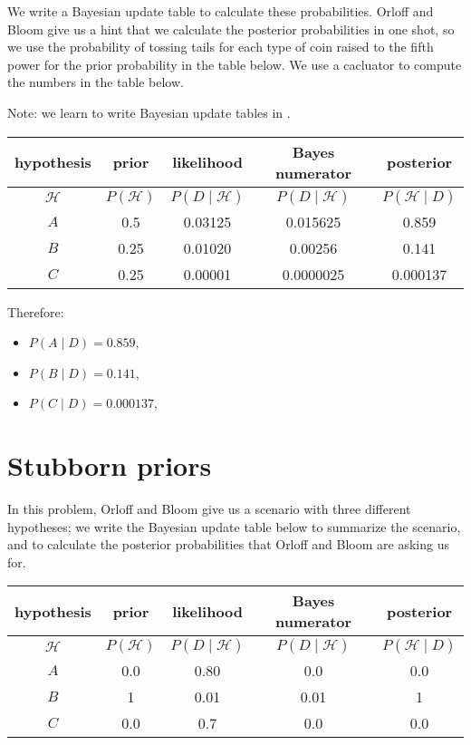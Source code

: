 \documentclass{article}
\begin{document}
We write a Bayesian update table to calculate these probabilities.
Orloff and Bloom give us a hint that we calculate the posterior probabilities
in one shot, so we use the probability of tossing tails for each type of
coin raised to the fifth power for the prior probability in the table
below. We use a cacluator to compute the numbers in the table below.

Note: we learn to write Bayesian update tables in \cite{reading11}.

\begin{center}
\begin{tabular}{ | c | c | c | c  | c | }
    \hline
    hypothesis & prior & likelihood & Bayes numerator & posterior\\ \hline
    $\mathcal{H}$ & $P\left(\mathcal{H}\right)$ & $P\left(D \mid \mathcal{H}\right)$ & $P\left(D \mid \mathcal{H} \right)$ & $P\left(\mathcal{H} \mid D \right)$ \\ \hline
    $A$ & 0.5  & 0.03125 & 0.015625  & 0.859 \\ \hline
    $B$ & 0.25 & 0.01020 & 0.00256   & 0.141 \\ \hline
    $C$ & 0.25 & 0.00001 & 0.0000025 & 0.000137 \\ \hline
  \end{tabular}
\end{center}

Therefore:

\begin{itemize}
\item $P\left(A \mid D \right) = 0.859$,
\item $P\left(B \mid D \right) = 0.141$,
\item $P\left(C \mid D \right) = 0.000137$,
\end{itemize}


\section{Stubborn priors}
In this problem, Orloff and Bloom give us a scenario with three
different hypotheses; we write the Bayesian update table below
to summarize the scenario, and to calculate the posterior probabilities
that Orloff and Bloom are asking us for.

\begin{center}
\begin{tabular}{ | c | c | c | c  | c | }
    \hline
    hypothesis & prior & likelihood & Bayes numerator & posterior\\ \hline
    $\mathcal{H}$ & $P\left(\mathcal{H}\right)$ & $P\left(D \mid \mathcal{H}\right)$ & $P\left(D \mid \mathcal{H} \right)$ & $P\left(\mathcal{H} \mid D \right)$ \\ \hline
    $A$ & 0.0  & 0.80 & 0.0  & 0.0 \\ \hline
    $B$ & 1    & 0.01 & 0.01 & 1   \\ \hline
    $C$ & 0.0  & 0.7 & 0.0   & 0.0 \\ \hline
  \end{tabular}
\end{center}
\end{document}
